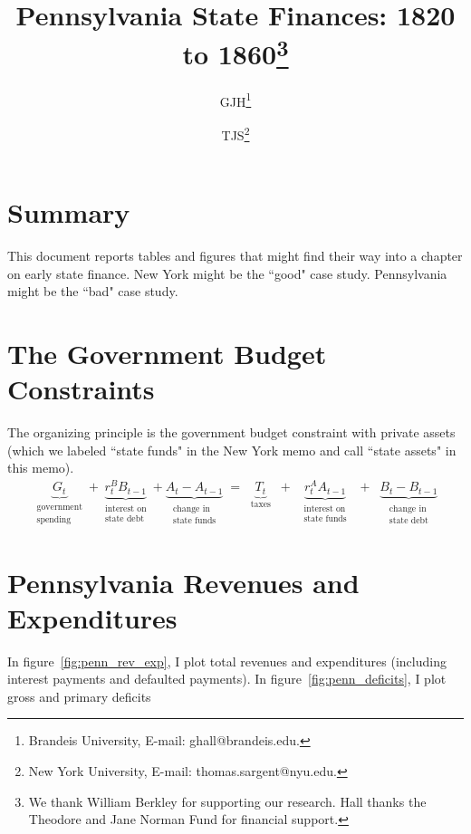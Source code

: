 \documentclass[11pt]{article}
\title{Pennsylvania State Finances: 1820 to 1860\footnote{ 
We thank William Berkley for supporting our research. 
Hall thanks the Theodore and Jane Norman Fund for financial support.}}
\author{GJH\footnote{Brandeis University, E-mail: ghall@brandeis.edu.} \and
TJS\footnote{New York University, E-mail: thomas.sargent@nyu.edu.}}
\begin{document}
\graphicspath{{Penn_figures/}}

\maketitle




\section{Summary}


This document reports tables and figures that might find their way into 
a chapter on early state finance.  New York might be the ``good" case study.  Pennsylvania might
be the ``bad" case study.


\section{The Government Budget Constraints}

The organizing principle is the government budget constraint with private assets (which we labeled ``state funds" in the New York memo and call ``state assets" in this memo).  
\begin{eqnarray}
\underbrace{G_t}_{\substack{\text{government}\\\text{spending}}}  + \underbrace{r_t^B B_{t-1}}_{\substack{\text{interest on}\\\text{state debt}}} + \underbrace{A_t - A_{t-1}}_{\substack{\text{change in}\\ \text{state funds}}} \; = \; \; \underbrace{T_t}_{\text{taxes}}
\; \; + \; \; \underbrace{r_t^A A_{t-1}}_{\substack{\text{interest on}\\ \text{state funds}}}  \; \;  +  \; \; \underbrace{B_t - B_{t-1}}_{\substack{\text{change in}\\ \text{state debt}}} 
\label{eq:penn_consolidated_bc}
\end{eqnarray}



\section{Pennsylvania Revenues and Expenditures}

In figure~\ref{fig:penn_rev_exp}, I plot total revenues and expenditures (including interest payments 
and defaulted payments).  In figure~\ref{fig:penn_deficits}, I plot gross and primary deficits
\end{document}
